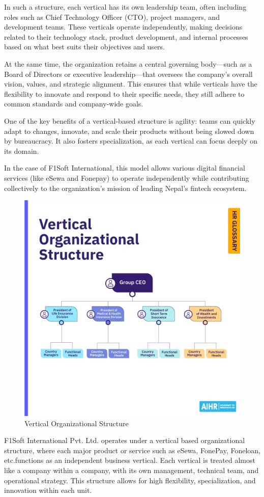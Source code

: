 \documentclass[12pt, a4paper]{report}
\begin{document}
In such a structure, each vertical has its own leadership team, often including roles such as Chief Technology Officer (CTO), project managers, and development teams. These verticals operate independently, making decisions related to their technology stack, product development, and internal processes based on what best suits their objectives and users.

At the same time, the organization retains a central governing body—such as a Board of Directors or executive leadership—that oversees the company’s overall vision, values, and strategic alignment. This ensures that while verticals have the flexibility to innovate and respond to their specific needs, they still adhere to common standards and company-wide goals.

One of the key benefits of a vertical-based structure is agility: teams can quickly adapt to changes, innovate, and scale their products without being slowed down by bureaucracy. It also fosters specialization, as each vertical can focus deeply on its domain.

In the case of F1Soft International, this model allows various digital financial services (like eSewa and Fonepay) to operate independently while contributing collectively to the organization’s mission of leading Nepal's fintech ecosystem.
\begin{figure}
\centering
\includegraphics[scale=0.3]{images/vertical.png}
\caption{Vertical Organizational Structure}
\end{figure}
\vspace{18pt}
F1Soft International Pvt. Ltd. operates under a vertical based organizational structure, where each major product or service such as eSewa, FonePay, Foneloan, etc.functions as an independent business vertical. Each vertical is treated almost like a company within a company, with its own management, technical team, and operational strategy. This structure allows for high flexibility, specialization, and innovation within each unit.
\vspace{18pt}
\end{document}
